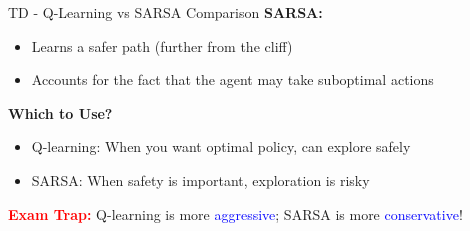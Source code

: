 \documentclass[8pt]{beamer}
\begin{document}
\begin{frame}{TD - Q-Learning vs SARSA Comparison}
		\textbf{SARSA:}
		\begin{itemize}
			\item Learns a safer path (further from the cliff)
			\item Accounts for the fact that the agent may take suboptimal actions
		\end{itemize}
		
		\textbf{Which to Use?}
		\begin{itemize}
			\item Q-learning: When you want optimal policy, can explore safely
			\item SARSA: When safety is important, exploration is risky
		\end{itemize}
		
		\textcolor{red}{\textbf{Exam Trap:}} Q-learning is more \textcolor{blue}{aggressive}; SARSA is more \textcolor{blue}{conservative}!
	\end{frame}
	
\end{document}
